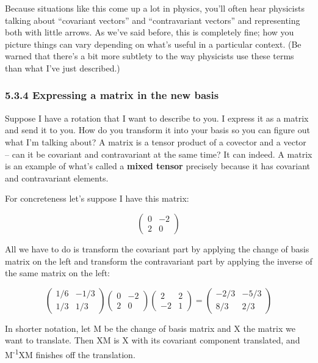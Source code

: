 \documentclass[oneside,english]{amsbook}
\numberwithin{section}{chapter}
\theoremstyle{plain}
\theoremstyle{definition}
\begin{document}
Because situations like this come up a lot in physics, you'll often hear
physicists talking about ``covariant vectors'' and ``contravariant
vectors'' and representing both with little arrows. As we've said
before, this is completely fine; how you picture things can vary
depending on what's useful in a particular context. (Be warned that
there's a bit more subtlety to the way physicists use these terms than
what I've just described.)

\subsubsection{5.3.4 Expressing a matrix in the new
	basis}\label{expressing-a-matrix-in-the-new-basis}

Suppose I have a rotation that I want to describe to you. I express it
as a matrix and send it to you. How do you transform it into your basis
so you can figure out what I'm talking about? A matrix is a tensor
product of a covector and a vector -- can it be covariant and
contravariant at the same time? It can indeed. A matrix is an example of
what's called a \textbf{mixed tensor} precisely because it has covariant
and contravariant elements.

For concreteness let's suppose I have this matrix:

\[\begin{pmatrix}
	0 & - 2 \\
	2 & 0
\end{pmatrix}\]

All we have to do is transform the covariant part by applying the change
of basis matrix on the left and transform the contravariant part by
applying the inverse of the same matrix on the left:

\[\begin{pmatrix}
	1/6 & - 1/3 \\
	1/3 & 1/3
\end{pmatrix}\begin{pmatrix}
	0 & - 2 \\
	2 & 0
\end{pmatrix}\begin{pmatrix}
	2 & 2 \\
	- 2 & 1
\end{pmatrix} = \begin{pmatrix}
	- 2/3 & - 5/3 \\
	8/3 & 2/3
\end{pmatrix}\]

In shorter notation, let M be the change of basis matrix and X the
matrix we want to translate. Then XM is X with its covariant component
translated, and M\textsuperscript{-1}XM finishes off the translation.
\end{document}
